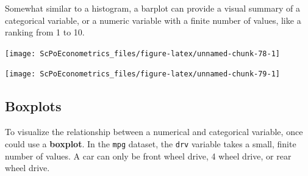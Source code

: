 \documentclass[]{book}
\newenvironment{Shaded}{\begin{snugshade}}{\end{snugshade}}
\newcommand{\KeywordTok}[1]{\textcolor[rgb]{0.13,0.29,0.53}{\textbf{#1}}}
\newcommand{\DataTypeTok}[1]{\textcolor[rgb]{0.13,0.29,0.53}{#1}}
\newcommand{\StringTok}[1]{\textcolor[rgb]{0.31,0.60,0.02}{#1}}
\newcommand{\OperatorTok}[1]{\textcolor[rgb]{0.81,0.36,0.00}{\textbf{#1}}}
\newcommand{\NormalTok}[1]{#1}
\begin{document}
Somewhat similar to a histogram, a barplot can provide a visual summary
of a categorical variable, or a numeric variable with a finite number of
values, like a ranking from 1 to 10.

\begin{Shaded}
\end{Shaded}

\begin{center}\texttt{[image: ScPoEconometrics\_files/figure-latex/unnamed-chunk-78-1]} \end{center}

\begin{Shaded}
\end{Shaded}

\begin{center}\texttt{[image: ScPoEconometrics\_files/figure-latex/unnamed-chunk-79-1]} \end{center}

\subsection{Boxplots}\label{boxplots}

To visualize the relationship between a numerical and categorical
variable, once could use a \textbf{boxplot}. In the \texttt{mpg}
dataset, the \texttt{drv} variable takes a small, finite number of
values. A car can only be front wheel drive, 4 wheel drive, or rear
wheel drive.

\begin{Shaded}
\end{Shaded}
\end{document}
